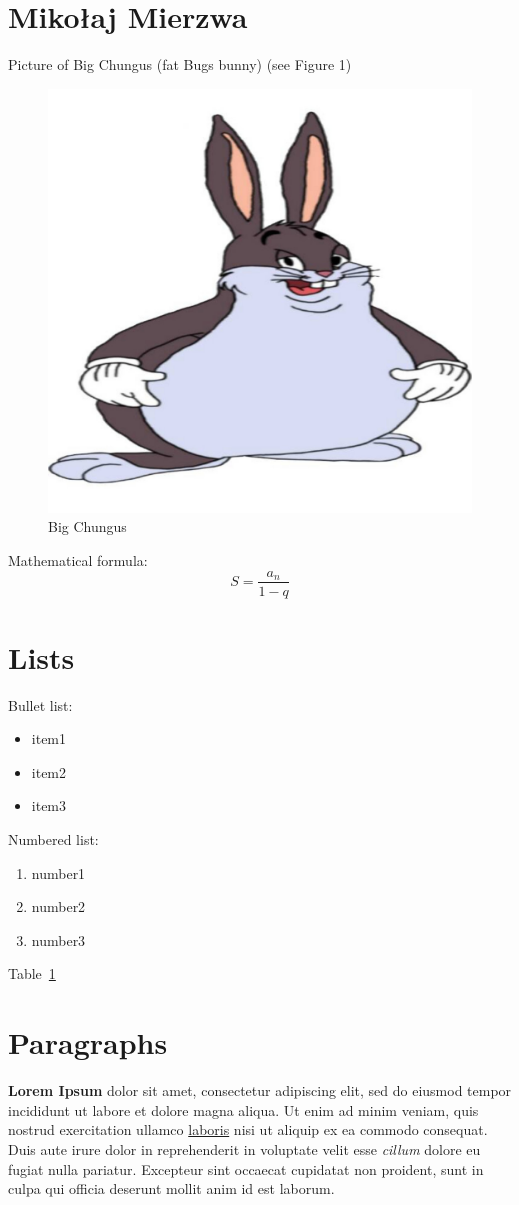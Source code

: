 \section{Mikołaj Mierzwa}
\label{sec:mm}

Picture of Big Chungus (fat Bugs bunny) (see Figure 1)
\begin{figure}[htbp]
    \centering
    \includegraphics[width=0.5\linewidth]{pictures/chungus.jpg}
    \caption{Big Chungus}
    \label{fig:enter-label}
\end{figure}

Mathematical formula: \[S = \frac{a_n}{1 - q}\]

\section*{Lists}

Bullet list:
\begin{itemize}
 \item item1
 \item item2
 \item item3
\end{itemize}


\hfill \break
Numbered list:
\begin{enumerate}
 \item number1
 \item number2
 \item number3
\end{enumerate}

\newpage

\par Table~\ref{sec:mm} 

\section*{Paragraphs}
\par \textbf{Lorem Ipsum} dolor sit amet, consectetur adipiscing elit, sed do eiusmod tempor incididunt ut labore et dolore magna aliqua. Ut enim ad minim veniam, quis nostrud exercitation ullamco \underline{laboris} nisi ut aliquip ex ea commodo consequat. Duis aute irure dolor in reprehenderit in voluptate velit esse \textit{cillum} dolore eu fugiat nulla pariatur. Excepteur sint occaecat cupidatat non proident, sunt in culpa qui officia deserunt mollit anim id est laborum.